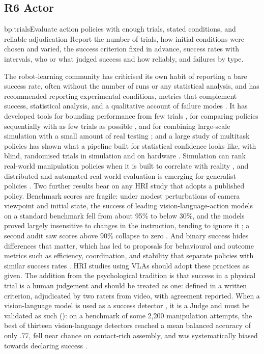 \subsection{R6 Actor}

\begin{practice}{bp:trials}{Evaluate action policies with enough trials, stated conditions, and reliable adjudication}
Report the number of trials, how initial conditions were chosen and varied,
the success criterion fixed in advance, success rates with intervals, who or
what judged success and how reliably, and failures by type.
\end{practice}

The robot-learning community has criticised its own habit of reporting a
bare success rate, often without the number of runs or any statistical
analysis, and has recommended reporting experimental conditions, metrics
that complement success, statistical analysis, and a qualitative account of
failure modes \cite{kressgazit2024robot}. It has developed tools for
bounding performance from few trials \cite{vincent2024how}, for comparing
policies sequentially with as few trials as possible \cite{snyder2025is},
and for combining large-scale simulation with a small amount of real
testing \cite{badithela2026reliable}; and a large study of multitask
policies has shown what a pipeline built for statistical confidence looks
like, with blind, randomised trials in simulation and on hardware
\cite{barreiros2026careful}. Simulation can rank real-world manipulation
policies when it is built to correlate with reality \cite{li2025evaluating},
and distributed and automated real-world evaluation is emerging for
generalist policies \cite{atreya2025roboarena,zhou2025autoeval}. Two
further results bear on any HRI study that adopts a published policy.
Benchmark scores are fragile: under modest perturbations of camera
viewpoint and initial state, the success of leading
vision-language-action models on a standard benchmark fell from about 95\%
to below 30\%, and the models proved largely insensitive to changes in the
instruction, tending to ignore it \cite{fei2025liberoplus}; a second audit
saw scores above 90\% collapse to zero \cite{zhou2025liberopro}. And
binary success hides differences that matter, which has led to proposals
for behavioural and outcome metrics such as efficiency, coordination, and
stability that separate policies with similar success rates
\cite{wang2026roboeval}. HRI studies using VLAs should adopt these
practices as given. The addition from the
psychological tradition is that success in a physical trial is a human
judgement and should be treated as one: defined in a written criterion,
adjudicated by two raters from video, with agreement reported. When a
vision-language model is used as a success detector \cite{du2023vision}, it
is a Judge and must be validated as such (): on a benchmark
of some 2{,}200 manipulation attempts, the best of thirteen vision-language
detectors reached a mean balanced accuracy of only .77, fell near chance on
contact-rich assembly, and was systematically biased towards declaring
success \cite{navasardyan2026failbench}.

